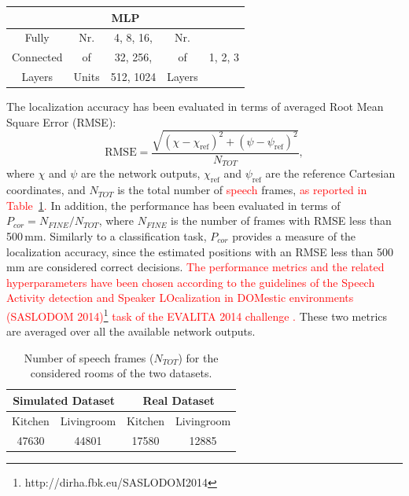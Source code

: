 \documentclass[review]{elsarticle}
\newcommand{\tableref}[1]{Table~\ref{#1}}
\begin{document}
\begin{table}[t]
{\begin{tabular} { c|c|c|c|c|c|c|c}
		\hline
		\multicolumn{8}{c}{MLP}\\
		\hline
		Fully  & Nr.  & \multicolumn{3}{|c|}{4, 8, 16,} & Nr. &  \multicolumn{2}{|c}{ }\\
		Connected	& of & \multicolumn{3}{|c|}{32, 256,} & of & \multicolumn{2}{|c}{ 1, 2, 3}\\
		Layers	& Units & \multicolumn{3}{|c|}{512, 1024} & Layers & \multicolumn{2}{|c}{} \\
		\hline                                                                      
	\end{tabular}
	}
\end{table}


The localization accuracy has been evaluated in terms of averaged Root Mean Square Error (RMSE):
\begin{equation}
\text{RMSE} = \frac{\sqrt{(\chi-\chi_{\text{ref}})^2 + (\psi-\psi_{\text{ref}})^2}}{N_{TOT}},
\end{equation}
where $\chi$ and $\psi$  are the network outputs, $\chi_{\text{ref}}$ and $\psi_{\text{ref}}$ are the reference Cartesian coordinates, and $N_{TOT}$ is the total number of \textcolor{red}{speech} frames, \textcolor{red}{{as reported in \tableref{tab:N_TOT}. }}
In addition, the performance has been evaluated in terms of $P_{cor} = N_{FINE}/N_{TOT}$, where $N_{FINE}$ is the 
number of frames with RMSE less than 500\,mm. 
Similarly to a classification task, $P_{cor}$ provides a measure of the localization accuracy, since the estimated positions with an RMSE less than 500\,mm are considered correct decisions. \textcolor{red}{The performance metrics and the related hyperparameters have been chosen according to the guidelines of the Speech Activity detection and Speaker LOcalization in DOMestic environments (SASLODOM 2014)\footnote{http://dirha.fbk.eu/SASLODOM2014} task of the EVALITA 2014 challenge \cite{basili2014proceedings}.} These two metrics are averaged over all the available network outputs. 

\begin{table}[t]
\centering
\caption{Number of speech frames ($N_{TOT}$) for the considered rooms of the two datasets.}\label{tab:N_TOT}
\begin{tabular}{cccc}
\hline
\multicolumn{2}{c|}{\textbf{Simulated Dataset}} & \multicolumn{2}{c}{\textbf{Real Dataset}} \\ \hline
\multicolumn{1}{c|}{Kitchen}           & \multicolumn{1}{c|}{Livingroom}          & \multicolumn{1}{c|}{Kitchen}                  & Livingroom                  \\ \hline
\multicolumn{1}{c|}{47630}             & \multicolumn{1}{c|}{44801}               & \multicolumn{1}{c|}{17580}                    & 12885  \\
\hline                    
\end{tabular}

\end{table}
\end{document}

